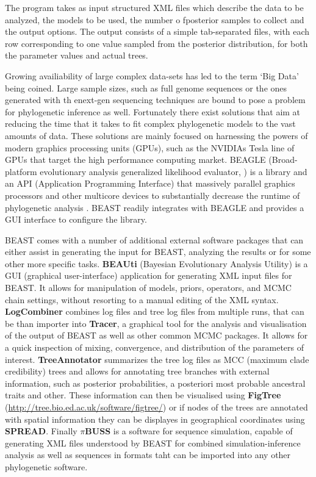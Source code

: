 The program takes as input structured XML files which describe the data to be analyzed, the models to be used, the number o fposterior samples to collect and the output options.
The output consists of a simple tab-separated files, with each row corresponding to one value sampled from the posterior distribution, for both the parameter values and actual trees.

Growing availiability of large complex data-sets has led to the term `Big Data' being coined.
Large sample sizes, such as full genome sequences or the ones generated with th enext-gen sequencing techniques are bound to pose a problem for phylogenetic inference as well.
Fortunately there exist solutions that aim at reducing the time that it takes to fit complex phylogenetic models to the vast amounts of data.
These solutions are mainly focused on harnessing the powers of modern graphics processing units (GPUs), such as the NVIDIAs Tesla line of GPUs that target the high performance computing market.
BEAGLE (Broad-platform evolutionary analysis generalized likelihood evaluator, \cite{Ayres2012}) is a library and an API (Application Programming Interface) that massively parallel graphics processors and other multicore devices to substantially decrease the runtime of phylogenetic analysis \citep{Suchard2009}.
BEAST readily integrates with BEAGLE and provides a GUI interface to configure the library.

BEAST comes with a number of additional external software packages that can either assist in generating the input for BEAST, analyzing the results or for some other more specific tasks.
\textbf{BEAUti} (Bayesian Evolutionary Analysis Utility) is a  GUI (graphical user-interface) application for generating XML input files for BEAST. 
It allows for manipulation of models, priors, operators, and MCMC chain settings, without resorting to a manual editing of the XML syntax.
\textbf{LogCombiner} combines log files and tree log files from multiple runs, that can be than importer into \textbf{Tracer}, a graphical tool for the analysis and visualisation of the output of BEAST as well as other common MCMC packages.
It allows for a quick inspection of mixing, convergence, and distribution of the parameters of interest.
\textbf{TreeAnnotator} summarizes the tree log files as MCC (maximum clade credibility) trees and allows for annotating tree branches with external information, such as posterior probabilities, a posteriori most probable ancestral traits and other.
These information can then be visualised using \textbf{FigTree} (\url{http://tree.bio.ed.ac.uk/software/figtree/}) or if nodes of the trees are annotated with spatial information they can be displayes in geographical coordinates using \textbf{SPREAD}.
Finally \textbf{$\pi$BUSS} is a software for sequence simulation, capable of generating XML files understood by BEAST for combined simulation-inference analysis as well as sequences in formats taht can be imported into any other phylogenetic software.

